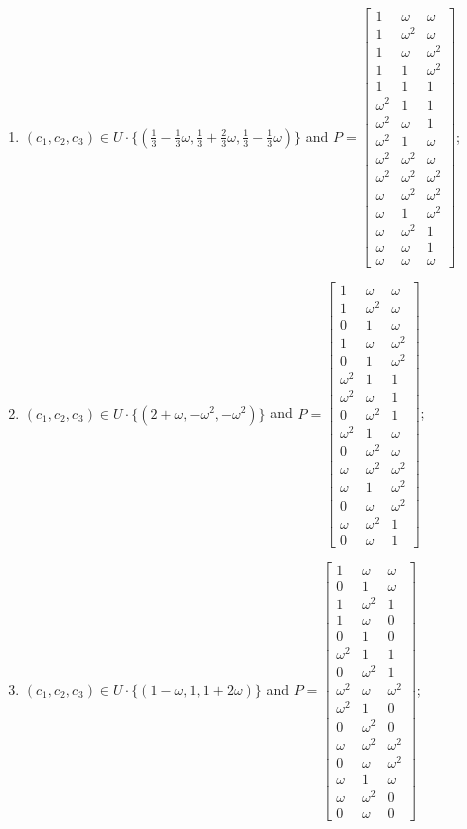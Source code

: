 \begin{enumerate}
\item[(f80)\,\newitem] $(c_1,c_2,c_3)\in U\cdot\{(\tfrac{1}{3}-\tfrac{1}{3}\omega,\tfrac{1}{3}+\tfrac{2}{3}\omega,\tfrac{1}{3}-\tfrac{1}{3}\omega)\}$ and $P=\begin{bmatrix}1&\omega&\omega\\1&\omega^2&\omega\\1&\omega&\omega^2\\1&1&\omega^2\\1&1&1\\\omega^2&1&1\\\omega^2&\omega&1\\\omega^2&1&\omega\\\omega^2&\omega^2&\omega\\\omega^2&\omega^2&\omega^2\\\omega&\omega^2&\omega^2\\\omega&1&\omega^2\\\omega&\omega^2&1\\\omega&\omega&1\\\omega&\omega&\omega\end{bmatrix}$;
\item[(f81)\,\newitem] $(c_1,c_2,c_3)\in U\cdot\{(2+\omega,-\omega^2,-\omega^2)\}$ and $P=\begin{bmatrix}1&\omega&\omega\\1&\omega^2&\omega\\0&1&\omega\\1&\omega&\omega^2\\0&1&\omega^2\\\omega^2&1&1\\\omega^2&\omega&1\\0&\omega^2&1\\\omega^2&1&\omega\\0&\omega^2&\omega\\\omega&\omega^2&\omega^2\\\omega&1&\omega^2\\0&\omega&\omega^2\\\omega&\omega^2&1\\0&\omega&1\end{bmatrix}$;
\item[(f82)\,\newitem] $(c_1,c_2,c_3)\in U\cdot\{(1-\omega,1,1+2\omega)\}$ and $P=\begin{bmatrix}1&\omega&\omega\\0&1&\omega\\1&\omega^2&1\\1&\omega&0\\0&1&0\\\omega^2&1&1\\0&\omega^2&1\\\omega^2&\omega&\omega^2\\\omega^2&1&0\\0&\omega^2&0\\\omega&\omega^2&\omega^2\\0&\omega&\omega^2\\\omega&1&\omega\\\omega&\omega^2&0\\0&\omega&0\end{bmatrix}$;

\end{enumerate}
